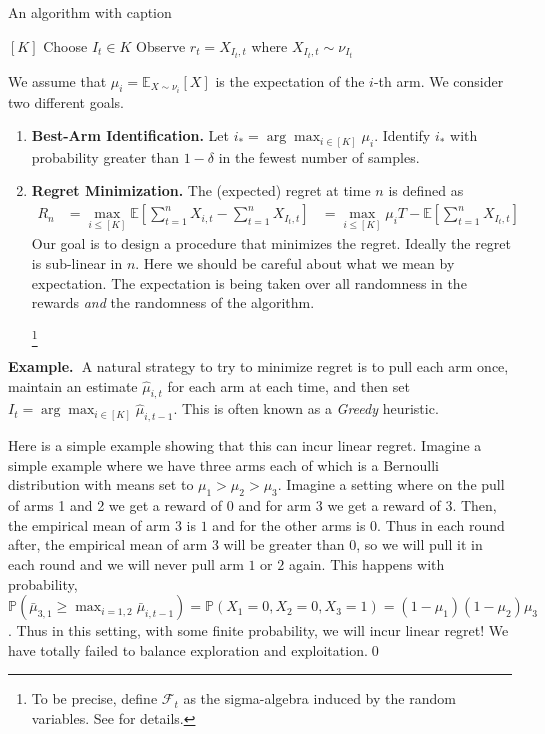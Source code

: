 \documentclass[11pt]{article}
\newcommand{\example}{\noindent\textbf{Example.\  }}
\renewcommand{\P}{\mathbb{P}}
\newcommand{\E}{\mathbb{E}}
\newcommand{\1}[1]{\mathbf{1}\left\{#1\right\}}
\begin{document}
\begin{algorithm}
\caption{An algorithm with caption}\label{alg:cap}
\begin{algorithmic}
\State $[K]$
    \State Choose $I_t\in K$
    \State Observe $r_t = X_{I_t, t}$ where $X_{I_t,t} \sim \nu_{I_t}$
\EndFor
\end{algorithmic}
\end{algorithm}


We assume that $\mu_i = \E_{X\sim \nu_i}[X]$ is the expectation of the $i$-th arm. We consider two different goals.
\begin{enumerate}
    \item \textbf{Best-Arm Identification.} Let $i_{\ast} = \arg\max_{i\in [K]}  \mu_i$. Identify $i_{\ast}$ with probability greater than $1-\delta$ in the fewest number of samples.
    \item \textbf{Regret Minimization.} The (expected) regret at time $n$ is defined as 
    \begin{align*}
        R_{n} &= \max_{i\leq [K]}\E\left[\sum_{t=1}^n X_{i, t} - \sum_{t=1}^n X_{I_t, t}\right]
              &= \max_{i\leq [K]} \mu_i T - \E[\sum_{t=1}^n X_{I_t, t}]
    \end{align*}
    Our goal is to design a procedure that minimizes the regret. Ideally the regret is sub-linear in $n$.
    Here we should be careful about what we mean by expectation. The expectation is being taken over all randomness in the rewards \textit{and} the randomness of the algorithm. 

    \footnote{To be precise, define $\mathcal{F}_t$ as the sigma-algebra induced by the random variables. See \cite{lattimore2020bandit} for details. }
\end{enumerate}

\example A natural strategy to try to minimize regret is to pull each arm once, maintain an estimate $\hat{\mu}_{i,t}$ for each arm at each time, and then set $I_t = \arg\max_{i\in [K]} \hat{\mu}_{i,t-1}$. This is often known as a \textit{Greedy} heuristic. 

Here is a simple example showing that this can incur linear regret. Imagine a simple example where we have three arms each of which is a Bernoulli distribution with means set to $\mu_1 > \mu_2 > \mu_3$. 
Imagine a setting where on the pull of arms 1 and 2 we get a reward of $0$ and for arm $3$ we get a reward of $3$. Then, the empirical mean of arm $3$ is $1$ and for the other arms is $0$. Thus in each round after, the empirical mean of arm $3$ will be greater than $0$, so we will pull it in each round and we will never pull arm $1$ or $2$ again. This happens with probability,
$\P(\bar{\mu}_{3,1} \geq \max_{i=1,2} \bar{\mu}_{i, t-1}) = \P(X_{1}=0, X_2=0, X_3 = 1) = (1-\mu_1)(1-\mu_2)\mu_3$. Thus in this setting, with some finite probability, we will incur linear regret! We have totally failed to balance exploration and exploitation.\qed
\end{document}
